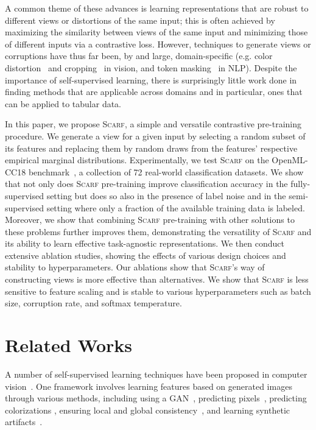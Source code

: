 A common theme of these advances is learning representations that are robust to different views or distortions of the same input; this is often achieved by maximizing the similarity between views of the same input and minimizing those of different inputs via a contrastive loss. However, techniques to generate views or corruptions have thus far been, by and large, domain-specific (e.g. color distortion~\citep{zhang2016colorful} and cropping~\citep{chen2020simple} in vision, and token masking~\citep{song2020mpnet} in NLP). Despite the importance of self-supervised learning, there is surprisingly little work done in finding methods that are applicable across domains and in particular, ones that can be applied to tabular data.

In this paper, we propose \textsc{Scarf}, a simple and versatile contrastive pre-training procedure. We generate a view for a given input by selecting a random subset of its features and replacing them by random draws from the features' respective empirical marginal distributions. Experimentally, we test \textsc{Scarf} on the OpenML-CC18 benchmark~\citep{OpenML2013,bischl2017openml,OpenMLPython2019}, a collection of 72 real-world classification datasets. We show that not only does \textsc{Scarf} pre-training improve classification accuracy in the fully-supervised setting but does so also in the presence of label noise and in the semi-supervised setting where only a fraction of the available training data is labeled. Moreover, we show that combining \textsc{Scarf} pre-training with other solutions to these problems further improves them, demonstrating the versatility of \textsc{Scarf} and its ability to learn effective task-agnostic representations. We then conduct extensive ablation studies, showing the effects of various design choices and stability to hyperparameters. Our ablations show that \textsc{Scarf}'s way of constructing views is more effective than alternatives. We show that \textsc{Scarf} is less sensitive to feature scaling and is stable to various hyperparameters such as batch size, corruption rate, and softmax temperature.

\section{Related Works}

A number of self-supervised learning techniques have been proposed in computer vision~\citep{zhai2019s4l,tung2017self,jing2020self}. One framework involves learning features based on generated images through various methods, including using a GAN~\citep{goodfellow2014generative,donahue2016adversarial,radford2015unsupervised,chen2018self}, predicting pixels~\citep{larsson2016learning}, predicting colorizations \citep{zhang2016colorful,larsson2017colorization}, ensuring local and global consistency~\citep{iizuka2017globally}, and learning synthetic artifacts~\citep{jenni2018self}.

